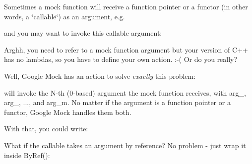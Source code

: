 Sometimes a mock function will receive a function pointer or a functor (in other words, a \char`\"{}callable\char`\"{}) as an argument, e.\+g.


\begin{DoxyCode}{0}
\DoxyCodeLine{\};}
\end{DoxyCode}


and you may want to invoke this callable argument\+:


\begin{DoxyCode}{0}
\end{DoxyCode}


Arghh, you need to refer to a mock function argument but your version of C++ has no lambdas, so you have to define your own action. \+:-\/( Or do you really?

Well, Google Mock has an action to solve {\itshape exactly} this problem\+:


\begin{DoxyCode}{0}
\end{DoxyCode}


will invoke the {\ttfamily N}-\/th (0-\/based) argument the mock function receives, with {\ttfamily arg\+\_}, {\ttfamily arg\+\_}, ..., and {\ttfamily arg\+\_\+m}. No matter if the argument is a function pointer or a functor, Google Mock handles them both.

With that, you could write\+:


\begin{DoxyCode}{0}
\end{DoxyCode}


What if the callable takes an argument by reference? No problem -\/ just wrap it inside {\ttfamily By\+Ref()}\+:


\begin{DoxyCode}{0}
\DoxyCodeLine{}
\end{DoxyCode}


